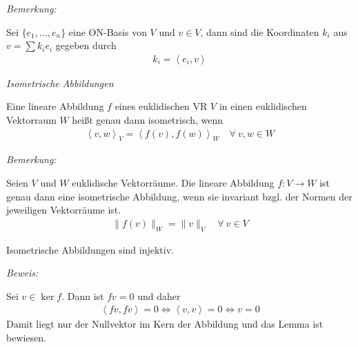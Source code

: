 \textit{Bemerkung:}

Sei $\{ e_1, \ldots, e_n \}$ eine ON-Basis von $V$ und $v \in V$, dann sind die Koordinaten $k_i$ aus $v = \sum k_i e_i$ gegeben durch
\begin{align*}
    k_i = \left\langle e_i,v \right\rangle
\end{align*}



\begin{mydef}\textit{Isometrische Abbildungen}\medskip

    Eine lineare Abbildung $f$ eines euklidischen VR $V$ in einen euklidischen Vektorraum $W$ heißt genau dann isometrisch, wenn
    \begin{align*}
        \left\langle v,w \right\rangle_V = \left\langle f(v),f(w) \right\rangle_W \quad \forall\ v,w \in W
    \end{align*}
\end{mydef}


\textit{Bemerkung:}

Seien $V$ und $W$ euklidische Vektorräume.
Die lineare Abbildung $f:V\rightarrow W$ ist genau dann eine isometrische Abbildung, wenn sie invariant bzgl. der Normen der jeweiligen Vektorräume ist.
\begin{align*}
    \| f(v) \|_W = \| v \|_V \quad \forall\ v\in V
\end{align*}

\begin{mylemma}
    Isometrische Abbildungen sind injektiv.\medskip

    \textit{Beweis:}

    Sei $v \in \ker f$. Dann ist $fv = 0$ und daher
    \begin{align*}
        \left\langle fv,fv \right\rangle = 0 \Leftrightarrow \left\langle v,v \right\rangle = 0 \Leftrightarrow v = 0
    \end{align*}
    Damit liegt nur der Nullvektor im Kern der Abbildung und das Lemma ist bewiesen.
\end{mylemma}

